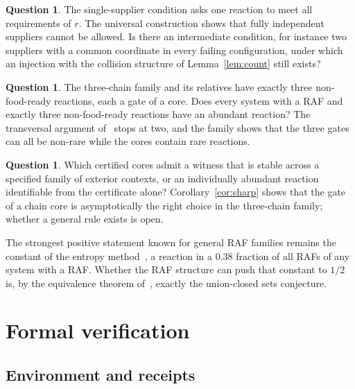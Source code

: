 \documentclass[11pt,a4paper]{article}
\theoremstyle{plain}
\theoremstyle{definition}
\newtheorem{question}[theorem]{Question}
\theoremstyle{remark}
\begin{document}
\begin{question}
The single-supplier condition asks one reaction to meet all requirements of $r$. The universal construction shows that fully independent suppliers cannot be allowed. Is there an intermediate condition, for instance two suppliers with a common coordinate in every failing configuration, under which an injection with the collision structure of Lemma~\ref{lem:count} still exists?
\end{question}

\begin{question}
The three-chain family and its relatives have exactly three non-food-ready reactions, each a gate of a core. Does every system with a RAF and exactly three non-food-ready reactions have an abundant reaction? The transversal argument of~\cite{elementary2026} stops at two, and the family shows that the three gates can all be non-rare while the cores contain rare reactions.
\end{question}

\begin{question}
Which certified cores admit a witness that is stable across a specified family of exterior contexts, or an individually abundant reaction identifiable from the certificate alone? Corollary~\ref{cor:sharp} shows that the gate of a chain core is asymptotically the right choice in the three-chain family; whether a general rule exists is open.
\end{question}

The strongest positive statement known for general RAF families remains the constant of the entropy method~\cite{gilmer2022constant,alweiss2022improved,chase2022approximate,sawin2022improved,cambie2022better}, a reaction in a $0.38$ fraction of all RAFs of any system with a RAF. Whether the RAF structure can push that constant to $1/2$ is, by the equivalence theorem of~\cite{elementary2026}, exactly the union-closed sets conjecture.

\appendix

\section{Formal verification}\label{app:lean}

\subsection{Environment and receipts}
\end{document}
